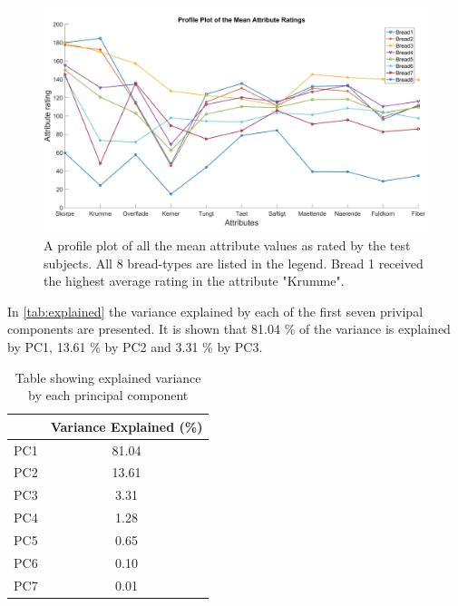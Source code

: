 \begin{figure}[H]
\centering
\includegraphics[width=\textwidth]{Figure/profile_plot.png}
\caption{A profile plot of all the mean attribute values as rated by the test subjects. All 8 bread-types are listed in the legend. Bread 1 received the highest average rating in the attribute "Krumme".}
\label{fig:plot}
\end{figure}
\noindent
%
%
In \autoref{tab:explained} the variance explained by each of the first seven privipal components are presented. It is shown that 81.04 \% of the variance is explained by PC1, 13.61 \% by PC2 and 3.31 \% by PC3. 
\begin{table}[H]
\centering
\begin{tabular}{lc}
\hline
                         & \multicolumn{1}{l}{Variance Explained (\%)} \\ \hline
\multicolumn{1}{l|}{PC1} & 81.04                                       \\
\multicolumn{1}{l|}{PC2} & 13.61                                       \\
\multicolumn{1}{l|}{PC3} & 3.31                                        \\
\multicolumn{1}{l|}{PC4} & 1.28                                        \\
\multicolumn{1}{l|}{PC5} & 0.65                                        \\
\multicolumn{1}{l|}{PC6} & 0.10                                        \\
\multicolumn{1}{l|}{PC7} & 0.01                                       
\end{tabular}
\caption{Table showing explained variance by each principal component}
\label{tab:explained}
\end{table}
